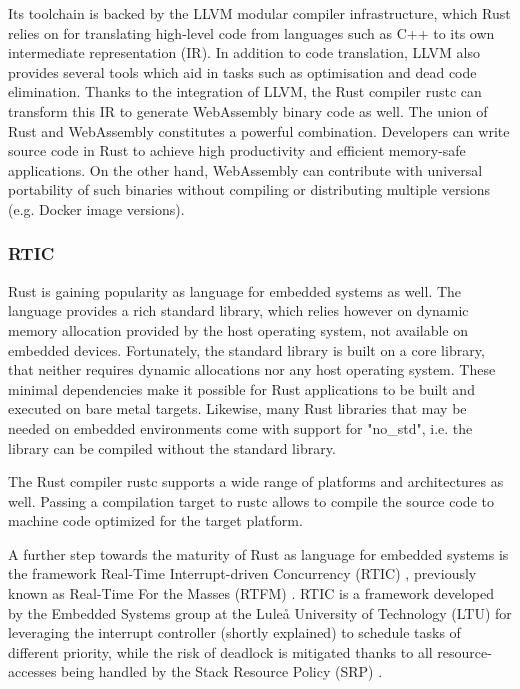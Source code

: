 Its toolchain is backed by the LLVM modular compiler infrastructure, which Rust relies on for translating high-level code from languages such as C++ to its own intermediate representation (IR). In addition to code translation, LLVM also provides several tools which aid in tasks such as optimisation and dead code elimination. Thanks to the integration of LLVM, the Rust compiler rustc can transform this IR to generate WebAssembly binary code as well. The union of Rust and WebAssembly constitutes a powerful combination. Developers can write source code in Rust to achieve high productivity and efficient memory-safe applications. On the other hand, WebAssembly can contribute with universal portability of such binaries without compiling or distributing multiple versions (e.g. Docker image versions). 

\subsubsection{RTIC}

Rust is gaining popularity as language for embedded systems as well. The language provides a rich standard library, which relies however on dynamic memory allocation provided by the host operating system, not available on embedded devices. Fortunately, the standard library is built on a core library, that neither requires dynamic allocations nor any host operating system. These minimal dependencies make it possible for Rust applications to be built and executed on bare metal targets. Likewise, many Rust libraries that may be needed on embedded environments come with support for "no\_std", i.e. the library can be compiled without the standard library. 

The Rust compiler rustc supports a wide range of platforms and architectures as well. Passing a compilation target to rustc allows to compile the source code to machine code optimized for the target platform.

A further step towards the maturity of Rust as language for embedded systems is the framework Real-Time Interrupt-driven Concurrency (RTIC) \cite{rtic}, previously known as Real-Time For the Masses (RTFM) \cite{rtfm}. RTIC is a framework developed by the Embedded Systems group at the Luleå University of Technology (LTU) for leveraging the interrupt controller (shortly explained) to schedule tasks of different priority, while the risk of deadlock is mitigated thanks to all resource-accesses being handled by the Stack Resource Policy (SRP) \cite{stack-resource-policy}.

